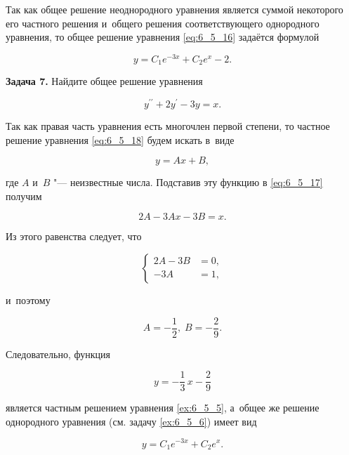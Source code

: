 Так как общее решение неоднородного уравнения является суммой
некоторого его частного решения и~общего решения соответствующего однородного уравнения,
то общее решение уравнения \eqref{eq:6_5_16} задаётся формулой

\begin{equation*}
y = C_{1}e^{-3x} + C_{2}e^{x} - 2.
\end{equation*}

\textbf{Задача 7.}\label{ex:6_5_7} Найдите общее решение уравнения

\begin{equation}\label{eq:6_5_18}
y^{\prime\prime} + 2y^\prime - 3y = x.
\end{equation}

Так как правая часть уравнения есть многочлен первой степени, то частное решение уравнения
\eqref{eq:6_5_18} будем искать в~виде

\begin{equation*}
y = Ax + B,
\end{equation*}

\noindent
где $A$ и~$B$ "--- неизвестные числа. Подставив эту функцию в \eqref{eq:6_5_17} получим

\begin{equation*}
2A - 3Ax - 3B = x.
\end{equation*}

Из этого равенства следует, что

\begin{equation*}
\begin{cases}
2A - 3B &= 0, \\
    -3A &= 1,
\end{cases}
\end{equation*}

\noindent
и~поэтому

\begin{equation*}
A = -\dfrac{1}{2}, \; B = -\dfrac{2}{9}.
\end{equation*}

\noindent
Следовательно, функция

\begin{equation*}
y = -\dfrac{1}{3} \, x - \dfrac{2}{9}
\end{equation*}

\noindent
является частным решением уравнения \eqref{ex:6_5_5}, а~общее же решение
однородного уравнения (см. задачу \ref{ex:6_5_6}) имеет вид

\begin{equation*}
y = C_{1}e^{-3x} + C_{2}e^{x}.
\end{equation*}

